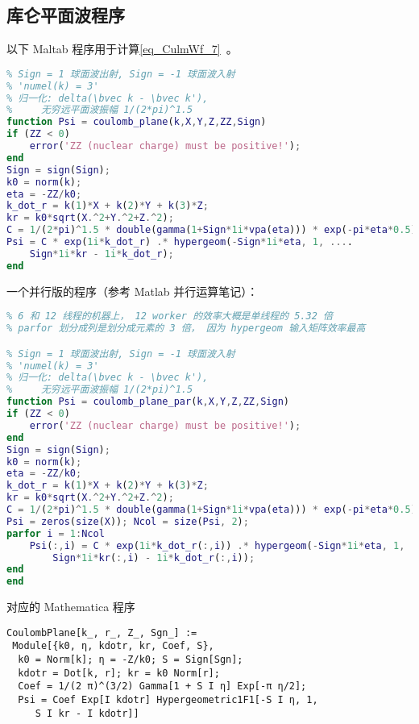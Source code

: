 \subsection{库仑平面波程序}
以下 Maltab 程序用于计算\autoref{eq_CulmWf_7}~。
\begin{lstlisting}[language=matlab, caption=coulomb\_plane.m]
% 直角坐标系的库仑平面波
% Sign = 1 球面波出射, Sign = -1 球面波入射
% 'numel(k) = 3'
% 归一化: delta(\bvec k - \bvec k'),
%     无穷远平面波振幅 1/(2*pi)^1.5
function Psi = coulomb_plane(k,X,Y,Z,ZZ,Sign)
if (ZZ < 0)
    error('ZZ (nuclear charge) must be positive!');
end
Sign = sign(Sign);
k0 = norm(k);
eta = -ZZ/k0;
k_dot_r = k(1)*X + k(2)*Y + k(3)*Z;
kr = k0*sqrt(X.^2+Y.^2+Z.^2);
C = 1/(2*pi)^1.5 * double(gamma(1+Sign*1i*vpa(eta))) * exp(-pi*eta*0.5);
Psi = C * exp(1i*k_dot_r) .* hypergeom(-Sign*1i*eta, 1, ....
    Sign*1i*kr - 1i*k_dot_r);
end
\end{lstlisting}

一个并行版的程序（参考 Matlab 并行运算笔记）：
\begin{lstlisting}[language=matlab, caption=coulomb\_plane\_par.m]
% 直角坐标系的库仑平面波 （coulomb_plane 的并行版， 需要 parallel toolbox）
% 6 和 12 线程的机器上， 12 worker 的效率大概是单线程的 5.32 倍
% parfor 划分成列是划分成元素的 3 倍， 因为 hypergeom 输入矩阵效率最高

% Sign = 1 球面波出射, Sign = -1 球面波入射
% 'numel(k) = 3'
% 归一化: delta(\bvec k - \bvec k'),
%     无穷远平面波振幅 1/(2*pi)^1.5
function Psi = coulomb_plane_par(k,X,Y,Z,ZZ,Sign)
if (ZZ < 0)
    error('ZZ (nuclear charge) must be positive!');
end
Sign = sign(Sign);
k0 = norm(k);
eta = -ZZ/k0;
k_dot_r = k(1)*X + k(2)*Y + k(3)*Z;
kr = k0*sqrt(X.^2+Y.^2+Z.^2);
C = 1/(2*pi)^1.5 * double(gamma(1+Sign*1i*vpa(eta))) * exp(-pi*eta*0.5);
Psi = zeros(size(X)); Ncol = size(Psi, 2);
parfor i = 1:Ncol
    Psi(:,i) = C * exp(1i*k_dot_r(:,i)) .* hypergeom(-Sign*1i*eta, 1, ....
        Sign*1i*kr(:,i) - 1i*k_dot_r(:,i));
end
end
\end{lstlisting}

对应的 Mathematica 程序 %
\begin{lstlisting}[language=mma]
CoulombPlane[k_, r_, Z_, Sgn_] := 
 Module[{k0, η, kdotr, kr, Coef, S},
  k0 = Norm[k]; η = -Z/k0; S = Sign[Sgn];
  kdotr = Dot[k, r]; kr = k0 Norm[r];
  Coef = 1/(2 π)^(3/2) Gamma[1 + S I η] Exp[-π η/2];
  Psi = Coef Exp[I kdotr] Hypergeometric1F1[-S I η, 1, 
     S I kr - I kdotr]]
\end{lstlisting}
